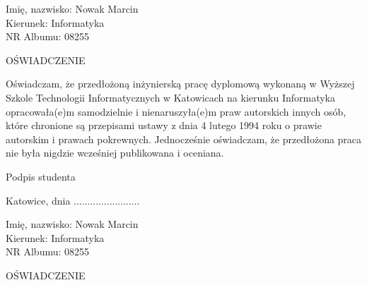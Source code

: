 \documentclass[a4paper, 10pt, twoside, openright]{report}
\begin{document}
\begin{large}
\begin{flushleft}
    {Imię, nazwisko: Nowak Marcin}\\
    {Kierunek:       Informatyka}\\
    {NR Albumu:      08255}\\
\end{flushleft}


\medskip
\begin{center}
    \begin{onehalfspace}
        \textsc{\LARGE{OŚWIADCZENIE}}\\
    \end{onehalfspace}
\end{center}
\medskip


{Oświadczam, że przedłożoną inżynierską pracę dyplomową wykonaną w Wyższej 
Szkole Technologii Informatycznych w Katowicach na kierunku Informatyka 
opracowała(e)m samodzielnie i nienaruszyła(e)m praw autorskich innych osób, 
które chronione są przepisami ustawy z dnia 4 lutego 1994 roku o prawie 
autorskim i prawach pokrewnych. Jednocześnie oświadczam, że przedłożona praca 
nie była nigdzie wcześniej publikowana i oceniana.}



\bigskip
\bigskip
\begin{flushright}
    {Podpis studenta}
\end{flushright}

\newpage\null

\newpage
\begin{flushright}
    {Katowice, dnia ........................}
\end{flushright}

\smallskip

\begin{flushleft}
    {Imię, nazwisko: Nowak Marcin}\\
    {Kierunek:       Informatyka}\\
    {NR Albumu:      08255}\\
\end{flushleft}


\medskip
\begin{center}
    \begin{onehalfspace}
        \textsc{\LARGE{OŚWIADCZENIE}}\\
    \end{onehalfspace}
\end{center}
\medskip


\end{large}
\end{document}
